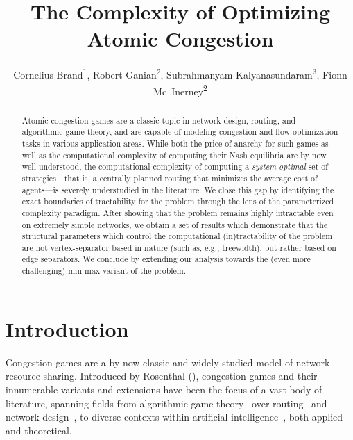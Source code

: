 \documentclass[letterpaper]{article} %
\title{The Complexity of Optimizing Atomic Congestion}
\author{Cornelius Brand\textsuperscript{\rm 1}, Robert Ganian\textsuperscript{\rm 2}, Subrahmanyam Kalyanasundaram\textsuperscript{\rm 3}, Fionn {Mc~Inerney}\textsuperscript{\rm 2}}
\begin{document}
\maketitle

\begin{abstract}
Atomic congestion games are a classic topic in network design, routing, and algorithmic game theory, and are capable of modeling congestion and flow optimization tasks in various application areas.
While both the price of anarchy for such games as well as the computational complexity of computing their Nash equilibria are by now well-understood,
the computational complexity of computing a \emph{system-optimal} set of strategies---that is, a centrally planned routing that minimizes the average cost of agents---is severely understudied in the literature. 
We close this gap by identifying the exact boundaries of tractability for the problem through the lens of the parameterized complexity paradigm. 
After showing that the problem remains highly intractable even on extremely simple networks, we obtain a set of results which demonstrate that the structural parameters which control the computational (in)tractability of the problem are not vertex-separator based in nature (such as, e.g., treewidth), but rather based on edge separators. We conclude by extending our analysis towards the (even more challenging) min-max variant of the problem.
\end{abstract}

\section{Introduction}
Congestion games are a by-now classic and widely studied model of network resource sharing.
Introduced by Rosenthal (\citeyear{Rosenthal73}), congestion games and their innumerable variants and extensions have been the focus of a vast body of literature, spanning fields from algorithmic game theory~\cite{CominettiS0M19} over routing~\cite{KunniyurS03} and network design~\cite{AnshelevichDKTWR04}, to diverse contexts within artificial intelligence~\cite{AshlagiMT07,MeirTBK12,MarchesiC019,HarksHKMS22}, both applied and theoretical.
\end{document}
